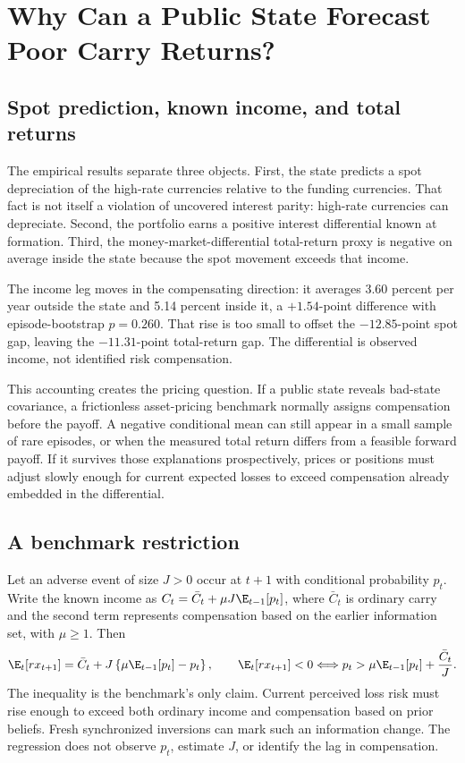 \section{Why Can a Public State Forecast Poor Carry Returns?}
\label{sec:compensation}

\subsection{Spot prediction, known income, and total returns}

The empirical results separate three objects. First, the state predicts a spot depreciation of the high-rate currencies relative to the funding currencies. That fact is not itself a violation of uncovered interest parity: high-rate currencies can depreciate. Second, the portfolio earns a positive interest differential known at formation. Third, the money-market-differential total-return proxy is negative on average inside the state because the spot movement exceeds that income.

The income leg moves in the compensating direction: it averages 3.60 percent per year outside the state and 5.14 percent inside it, a $+1.54$-point difference with episode-bootstrap $p=0.260$. That rise is too small to offset the $-12.85$-point spot gap, leaving the $-11.31$-point total-return gap. The differential is observed income, not identified risk compensation.

This accounting creates the pricing question. If a public state reveals bad-state covariance, a frictionless asset-pricing benchmark normally assigns compensation before the payoff. A negative conditional mean can still appear in a small sample of rare episodes, or when the measured total return differs from a feasible forward payoff. If it survives those explanations prospectively, prices or positions must adjust slowly enough for current expected losses to exceed compensation already embedded in the differential.

\subsection{A benchmark restriction}

Let an adverse event of size $J>0$ occur at $t+1$ with conditional probability $p_t$. Write the known income as $C_t=\bar C_t+\mu J\E_{t-1}[p_t]$, where $\bar C_t$ is ordinary carry and the second term represents compensation based on the earlier information set, with $\mu\geq1$. Then
\begin{equation}
    \E_t[rx_{t+1}]
      =\bar C_t+J\left\{\mu\E_{t-1}[p_t]-p_t\right\},
    \qquad
    \E_t[rx_{t+1}]<0
      \Longleftrightarrow
      p_t>\mu\E_{t-1}[p_t]+\frac{\bar C_t}{J}.
    \label{eq:predetermined_compensation}
\end{equation}
The inequality is the benchmark's only claim. Current perceived loss risk must rise enough to exceed both ordinary income and compensation based on prior beliefs. Fresh synchronized inversions can mark such an information change. The regression does not observe $p_t$, estimate $J$, or identify the lag in compensation.

